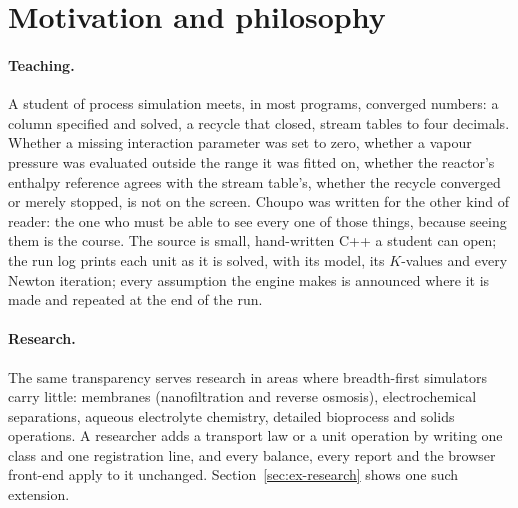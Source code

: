 \documentclass[11pt,a4paper]{article}
\begin{document}
\section{Motivation and philosophy}
\label{sec:motivation}

\paragraph{Teaching.}  A student of process simulation meets, in most
programs, converged numbers: a column specified and solved, a recycle that
closed, stream tables to four decimals.  Whether a missing interaction
parameter was set to zero, whether a vapour pressure was evaluated outside
the range it was fitted on, whether the reactor's enthalpy reference agrees
with the stream table's, whether the recycle converged or merely stopped,
is not on the screen.  Choupo was written for the other kind of reader: the
one who must be able to see every one of those things, because seeing them
is the course.  The source is small, hand-written C++ a student can open;
the run log prints each unit as it is solved, with its model, its
$K$-values and every Newton iteration; every assumption the engine makes is
announced where it is made and repeated at the end of the run.

\paragraph{Research.}  The same transparency serves research in areas
where breadth-first simulators carry little: membranes (nanofiltration and
reverse osmosis), electrochemical separations, aqueous electrolyte
chemistry, detailed bioprocess and solids operations.  A researcher adds a
transport law or a unit operation by writing one class and one registration
line, and every balance, every report and the browser front-end apply to it
unchanged.  Section~\ref{sec:ex-research} shows one such extension.
\end{document}
